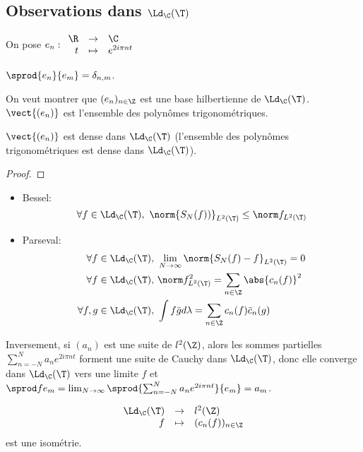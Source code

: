 \subsection{Observations dans $\Ld_{\C}(\T)$}


On pose $e_n : \begin{array}{rcl}
		\R & \to     & \C           \\
		t  & \mapsto & e^{2i\pi nt}
	\end{array}$

$\sprod {e_n} {e_m} = \delta_{n,m}$.

On veut montrer que $(e_n)_{n\in \Z}$ est une base hilbertienne de $\Ld_{\C}(\T)$.
$\vect {(e_n)}$ est l'ensemble  des polynômes trigonométriques.


\begin{theorem}
	$\vect {(e_n)}$ est dense dans $\Ld_{\C}(\T)$ (l'ensemble des polynômes trigonométriques est dense dans $\Ld_{\C}(\T)$).
\end{theorem}

\begin{proof}
\end{proof}


\begin{coro}[Conséquences]

	\begin{itemize}
		\item Bessel: $$\forall f \in \Ld_{\C}(\T), \ \norm {S_N(f))}_{L^2(\T)} \leq \norm f_{L^2(\T)}$$
		\item Parseval:
		      \begin{eqnarray*}
			      \forall f \in \Ld_{\C}(\T),& \ \lim_{N\to \infty} \norm {S_N(f) - f}_{L^2(\T)} = 0 \\
			      \forall f \in \Ld_{\C}(\T),& \ \norm f_{L^2(\T)}^2 = \sum_{n\in \Z} \abs {c_n(f)}^2 \\
			      \forall f, g \in \Ld_{\C}(\T),& \ \int f\bar g d \lambda = \sum_{n\in \Z} c_n(f) \bar c_n(g)
		      \end{eqnarray*}
	\end{itemize}

	Inversement, si $(a_n)$ est une suite de $l^2(\Z)$, alors les sommes partielles $\sum_{n=-N}^N a_n e^{2i\pi nt}$ forment
	une suite de Cauchy dans $\Ld_{\C}(\T)$, donc elle converge dans $\Ld_{\C}(\T)$ vers une limite $f$ et
	$\sprod f {e_m} = \lim_{N\to \infty} \sprod {\sum_{n=-N}^N a_n e^{2i\pi nt}} {e_m} = a_m$.
\end{coro}


\begin{theorem}
	$$\begin{array}{rcl}
			\Ld_{\C}(\T) & \to     & l^2(\Z)            \\
			f            & \mapsto & (c_n(f))_{n\in \Z}
		\end{array}$$ est une isométrie.
\end{theorem}

